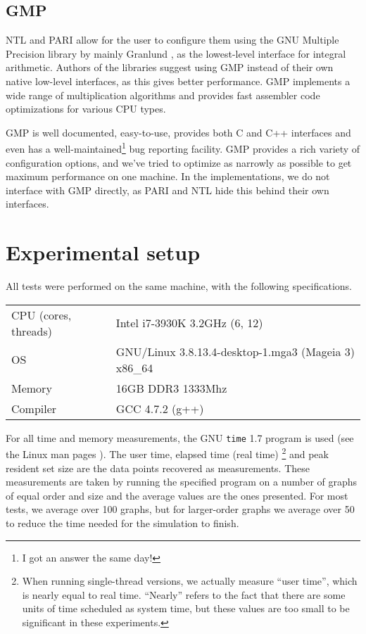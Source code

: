 \documentclass{cslthse-msc}
\newcommand{\code}{\texttt}
\begin{document}
\subsection{GMP}
NTL and PARI allow for the user to configure them using the GNU Multiple Precision library by mainly Granlund \cite{gmp}, as the lowest-level interface for integral arithmetic. Authors of the libraries suggest using GMP instead of their own native low-level interfaces, as this gives better performance. GMP implements a wide range of multiplication algorithms and provides fast assembler code optimizations for various CPU types.

GMP is well documented, easy-to-use, provides both C and C++ interfaces and even has a well-maintained\footnote{I got an answer the same day!} bug reporting facility. GMP provides a rich variety of configuration options, and we've tried to optimize as narrowly as possible to get maximum performance on one machine. In the implementations, we do not interface with GMP directly, as PARI and NTL hide this behind their own interfaces.


\section{Experimental setup}\label{experimentalsetup}
All tests were performed on the same machine, with the following specifications.

\begin{center}
\begin{tabular}{l|l}
CPU (cores, threads) & Intel i7-3930K 3.2GHz (6, 12) \\ 
OS & GNU/Linux 3.8.13.4-desktop-1.mga3 (Mageia 3) x86\_64 \\ 
Memory & 16GB DDR3 1333Mhz \\ 
Compiler & GCC 4.7.2 (g++) \\ 
\end{tabular}
\end{center}

For all time and memory measurements, the GNU \code{time} 1.7 program is used (see the Linux man pages \cite{time}). The user time, elapsed time (real time)
\footnote{When running single-thread versions, we actually measure ``user time'', which is nearly equal to real time. ``Nearly'' refers to the fact that there are some units of time scheduled as system time, but these values are too small to be significant in these experiments.}
and peak resident set size are the data points recovered as measurements. These measurements are taken by running the specified program on a number of graphs of equal order and size and the average values are the ones presented. For most tests, we average over 100 graphs, but for larger-order graphs we average over 50 to reduce the time needed for the simulation to finish.
\end{document}
